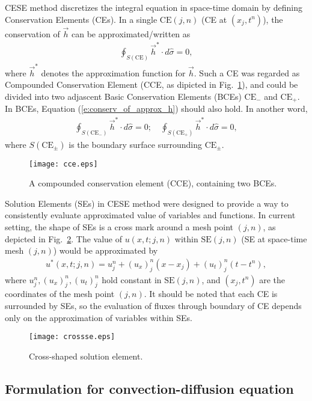 \documentclass[11pt,dvips]{article}
\renewcommand{\figurename}{Fig.}
\numberwithin{equation}{section}
\begin{document}
CESE method discretizes the integral equation in space-time domain by
defining Conservation Elements (CEs).  In a single $\mathrm{CE}(j,n)$ (CE at
$(x_j,t^n)$), the conservation of $\vec{h}$ can be approximated/written as
\begin{align}
  \oint_{S(\mathrm{CE})}\vec{h}^*\cdot d\hat{\sigma} = 0,
    \label{e:conserv_of_approx_h}
\end{align}
where $\vec{h}^*$ denotes the approximation function for $\vec{h}$.  Such a CE
was regarded as Compounded Conservation Element (CCE, as dipicted in
\figurename~\ref{f:cce}), and could be divided into two adjascent Basic
Conservation Elements (BCEs) $\mathrm{CE}_-$ and $\mathrm{CE}_+$.  In BCEs,
Equation (\ref{e:conserv_of_approx_h}) should also hold.  In another word,
\begin{align*}
  \oint_{S(\mathrm{CE}_-)}\vec{h}^*\cdot d\hat{\sigma} = 0; \quad
  \oint_{S(\mathrm{CE}_+)}\vec{h}^*\cdot d\hat{\sigma} = 0,
\end{align*}
where $S(\mathrm{CE}_{\pm})$ is the boundary surface surrounding
$\mathrm{CE}_{\pm}$.

\begin{figure}[htbp]
\centering
  \texttt{[image: cce.eps]}
  \caption{A compounded conservation element (CCE), containing two BCEs.}
  \label{f:cce}
\end{figure}

Solution Elements (SEs) in CESE method were designed to provide a way to
consistently evaluate approximated value of variables and functions.  In
current setting, the shape of SEs is a cross mark around a mesh point $(j,n)$,
as depicted in \figurename~\ref{f:crossse}.  The value of $u(x,t;j,n)$ within
$\mathrm{SE}(j,n)$ (SE at space-time mesh $(j,n)$) would be approximated by
\begin{align*}
  u^*(x,t;j,n) = u_j^n + (u_x)_j^n(x-x_j) + (u_t)_j^n(t-t^n),
\end{align*}
where $u_j^n, (u_x)_j^n, (u_t)_j^n$ hold constant in $\mathrm{SE}(j,n)$, and
$(x_j,t^n)$ are the coordinates of the mesh point $(j,n)$.  It should be noted
that each CE is surrounded by SEs, so the evaluation of fluxes through boundary
of CE depends only on the approximation of variables within SEs.

\begin{figure}[hbtp]
  \centering
  \texttt{[image: crossse.eps]}
  \caption{Cross-shaped solution element.}
  \label{f:crossse}
\end{figure}

\subsection{Formulation for convection-diffusion equation}
\end{document}
